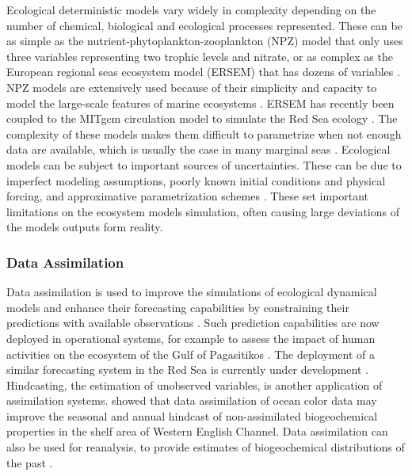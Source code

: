 Ecological deterministic models vary widely in complexity depending on the
number of chemical, biological and ecological processes represented. These can
be as simple as the nutrient-phytoplankton-zooplankton (NPZ) model
\citep{Anderson2005} that only uses three variables representing two trophic
levels and nitrate, or as complex as the European regional seas ecosystem model
(ERSEM) that has dozens of variables \citep{Baretta1995}. NPZ models are
extensively used because of their simplicity and capacity to model the
large-scale features of marine ecosystems \citep{Anderson2005}. ERSEM has
recently been coupled to the MITgcm circulation model to simulate the Red Sea
ecology \citep{Triantafyllou2014}.  The complexity of these models makes them
difficult to parametrize when not enough data are available, which is usually
the case in many marginal seas \citep{Anderson2005}. Ecological models can be
subject to important sources of uncertainties. These can be due to imperfect
modeling assumptions, poorly known initial conditions and physical forcing, and
approximative parametrization schemes \citep{Edwards2015}.  These set important
limitations on the ecosystem models simulation, often causing large deviations
of the models outputs form reality.

\subsubsection{Data Assimilation}

Data assimilation is used to improve the simulations of ecological dynamical
models and enhance their forecasting capabilities by constraining their
predictions with available observations \citep{Edwards2015}. Such prediction
capabilities are now deployed in operational systems, for example to assess
the impact of human activities on the ecosystem of the Gulf of Pagasitikos
\citep{Korres2012}. The deployment of a similar forecasting system in the Red
Sea is currently under development \citep{Triantafyllou2014}. Hindcasting, the
estimation of unobserved variables, is another application of assimilation
systems. \citet{Ciavatta2011} showed that data assimilation of ocean color data
may improve the seasonal and annual hindcast of non-assimilated biogeochemical
properties in the shelf area of Western English Channel. Data assimilation can
also be used for reanalysis, to provide estimates of biogeochemical
distributions of the past \citep{Fontana2013}.

